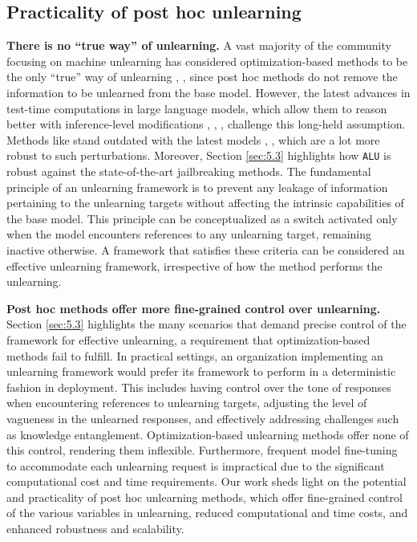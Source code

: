 \subsection{Practicality of post hoc unlearning}
\label{sec:5.5}
\textbf{There is no \enquote{true way} of unlearning.}
A vast majority of the community focusing on machine unlearning has considered optimization-based methods to be the only \enquote{true} way of unlearning \cite{maini2024tofu}, \cite{liu2024rethinking}, \cite{zhang2023fedrecovery} since post hoc methods do not remove the information to be unlearned from the base model. However, the latest advances in test-time computations in large language models, which allow them to reason better with inference-level modifications \cite{snell2024scalingllmtesttimecompute}, \cite{wei2023chainofthoughtpromptingelicitsreasoning}, \cite{wang2023selfconsistencyimproveschainthought}, challenge this long-held assumption. Methods like \cite{mangaokar2024prppropagatinguniversalperturbations} stand outdated with the latest models \cite{grattafiori2024llama3herdmodels}, \cite{qwen2.5}, \cite{abdin2024phi3technicalreporthighly} which are a lot more robust to such perturbations. Moreover, Section \ref{sec:5.3} highlights how \texttt{ALU} is robust against the state-of-the-art jailbreaking methods. The fundamental principle of an unlearning framework is to prevent any leakage of information pertaining to the unlearning targets without affecting the intrinsic capabilities of the base model. This principle can be conceptualized as a switch activated only when the model encounters references to any unlearning target, remaining inactive otherwise. A framework that satisfies these criteria can be considered an effective unlearning framework, irrespective of how the method performs the unlearning. 

\textbf{Post hoc methods offer more fine-grained control over unlearning.}
Section \ref{sec:5.3} highlights the many scenarios that demand precise control of the framework for effective unlearning, a requirement that optimization-based methods fail to fulfill. In practical settings, an organization implementing an unlearning framework would prefer its framework to perform in a deterministic fashion in deployment. This includes having control over the tone of responses when encountering references to unlearning targets, adjusting the level of vagueness in the unlearned responses, and effectively addressing challenges such as knowledge entanglement. Optimization-based unlearning methods offer none of this control, rendering them inflexible. Furthermore, frequent model fine-tuning to accommodate each unlearning request is impractical due to the significant computational cost and time requirements. Our work sheds light on the potential and practicality of post hoc unlearning methods, which offer fine-grained control of the various variables in unlearning, reduced computational and time costs, and enhanced robustness and scalability.

